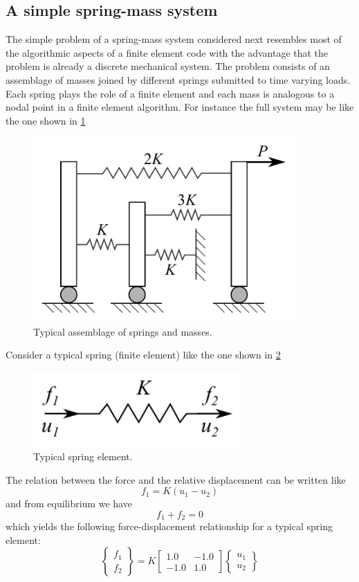 \subsection*{A simple spring-mass system}
The simple problem of a spring-mass system considered next resembles most of the algorithmic aspects of a finite element code with the advantage that the problem is already a discrete mechanical system. The problem consists of an assemblage of masses joined by different springs submitted to time varying loads. Each spring plays the role of a finite element and each mass is analogous to a nodal point in a finite element algorithm. For instance the full system may be like the one shown in \cref{fig:bathe}
\begin{figure}[H]
\centering
\includegraphics[width=10cm]{spring_system.pdf}
\caption{Typical assemblage of springs and masses.}
\label{fig:bathe}
\end{figure}


Consider a typical spring (finite element) like the one shown in \cref{fig:springel}
\begin{figure}[H]
\centering
\includegraphics[width=8cm]{springel.pdf}
\caption{Typical spring element.}
\label{fig:springel}
\end{figure}

The relation between the force and the relative displacement can be written like
\[f_1 = K(u_1 - u_2)\]
and from equilibrium we have
\[f_1 + f_2 = 0\]
which yields the following force-displacement relationship for a typical spring element:
\begin{equation}
    \begin{Bmatrix}
        f_1\\
        f_2
    \end{Bmatrix} =
    K\begin{bmatrix}
          1.0 & -1.0\\
        - 1.0 & 1.0
    \end{bmatrix}
    \begin{Bmatrix}
        u_1\\
        u_2
    \end{Bmatrix}
    \label{eq:Kspring}
\end{equation}

